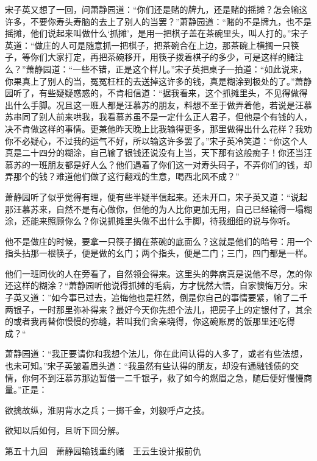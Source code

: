 \documentclass[12pt,UTF8]{ctexbook}
\begin{document}
{{{宋子英又想了一回，问萧静园道：“你们还是赌的牌九，还是赌的摇摊？怎会输这许多，不要你寿头寿脑的去上了别人的当罢？”萧静园道：“赌的不是牌九，也不是摇摊，他们说起来叫做什么‘抓摊’，是用一把棋子盖在茶碗里头，叫人打的。”宋子英道：“做庄的人可是随意抓一把棋子，把茶碗合在上边，那茶碗上横搁一只筷子，等你们大家打定，再把茶碗移开，用筷子拨着棋子的多少，可是这样的赌注么？”萧静园道：“一些不错，正是这个样儿。”宋子英把桌子一拍道：“如此说来，你果真上了别人的当，冤冤枉枉的去送掉这许多的钱，真是糊涂到极处的了。”萧静园听了，有些疑疑惑惑的，不肯相信道：“据我看来，这个抓摊里头，不见得做得出什么手脚。况且这一班人都是汪慕苏的朋友，料想不至于做弄着他，若说是汪慕苏串同了别人前来哄我，我看慕苏虽不是一定什么正人君子，但他是个有钱的人，决不肯做这样的事情。更兼他昨天晚上比我输得更多，那里做得出什么花样？我劝你不必疑心，不过我的运气不好，所以输这许多罢了。”宋子英冷笑道：“你这个人真是二十四分的糊涂，自己输了银钱还说没有上当，天下那有这般痴子！你还当汪慕苏的一班朋友都是好人么？他们遇着了你们这一对寿头码子，不弄你们的钱，却弄那个的钱？难道他们做了这行翻戏的生意，喝西北风不成？”

萧静园听了似乎觉得有理，便有些半疑半信起来。还未开口，宋子英又道：“说起那汪慕苏来，自然不是有心做你，但他的为人比你更加无用，自己已经输得一塌糊涂，还能来照顾你么？你说抓摊里头做不出什么手脚，待我细细的说与你听。

他不是做庄的时候，要拿一只筷子搁在茶碗的底面么？这就是他们的暗号：用一个指头拈那一根筷子，便是做的幺门；两个指头，便是二门；三门，四门都是一样。

他们一班同伙的人在旁看了，自然领会得来。这里头的弊病真是说他不尽，怎的你还这样的糊涂？“萧静园听他说得抓摊的毛病，方才恍然大悟，自家懊悔万分。宋子英又道：”如今事已过去，追悔他也是枉然，倒是你自己的事情要紧，输了二千两银子，一时那里弥补得来？最好今天你先想个法儿，把房子上的定银付了，其余的或者我再替你慢慢的弥缝，若叫我们舍亲晓得，你这碗账房的饭那里还吃得成？“

萧静园道：“我正要请你和我想个法儿，你在此间认得的人多了，或者有些法想，也未可知。”宋子英皱着眉头道：“我虽然有些认得的朋友，却没有通融钱债的交情，你何不到汪慕苏那边暂借一二千银子，救了如今的燃眉之急，随后便好慢慢商量。”正是：

欲擒故纵，淮阴背水之兵；一掷千金，刘毅呼卢之技。

欲知以后如何，且听下回分解。





第五十九回　萧静园输钱重约赌　王云生设计报前仇





}}}
\end{document}
